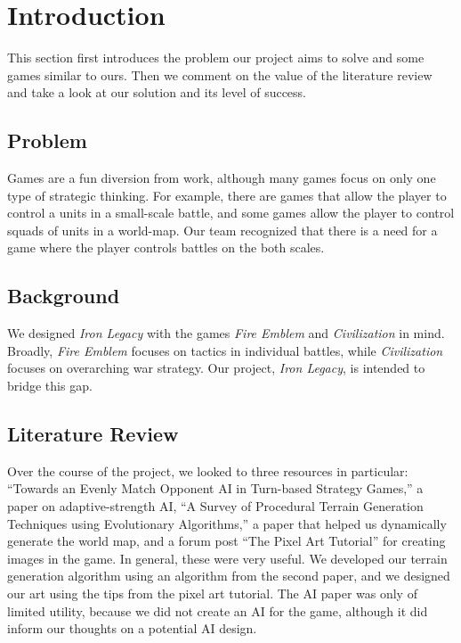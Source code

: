 \documentclass{article}
\begin{document}
\clearpage

\tableofcontents

\clearpage

\section*{Introduction}
This section first introduces the problem our project aims to solve and some
games similar to ours.
Then we comment on the value of the literature review and take a look at our
solution and its level of success.

\subsection*{Problem}
Games are a fun diversion from work, although many games focus on only one type
of strategic thinking.
For example, there are games that allow the player to control a units in a
small-scale battle, and some games allow the player to control
squads of units in a world-map.
Our team recognized that there is a need for a game where the player controls
battles on the both scales.

\subsection*{Background}
We designed \emph{Iron Legacy} with the games 
\emph{Fire Emblem}\cite{FireEmblem} and \emph{Civilization}\cite{Civilization}
in mind.
Broadly, \emph{Fire Emblem} focuses on tactics in individual battles, while
\emph{Civilization} focuses on overarching war strategy.
Our project, \emph{Iron Legacy}, is intended to bridge this gap.

\subsection*{Literature Review}
Over the course of the project, we looked to three resources in particular:
``Towards an Evenly Match Opponent AI in Turn-based Strategy Games,''\cite{AI} 
a paper on adaptive-strength AI, 
``A Survey of Procedural Terrain Generation Techniques using Evolutionary 
Algorithms,''\cite{Terrain Generation} a paper that helped us dynamically
generate the world map, and a forum post ``The Pixel Art 
Tutorial''\cite{Pixel Art} for creating images in the game.
In general, these were very useful.
We developed our terrain generation algorithm using an algorithm from the 
second paper, and we designed our art using the tips from the pixel art
tutorial.
The AI paper was only of limited utility, because we did not create an AI for
the game, although it did inform our thoughts on a potential AI design.
\end{document}
